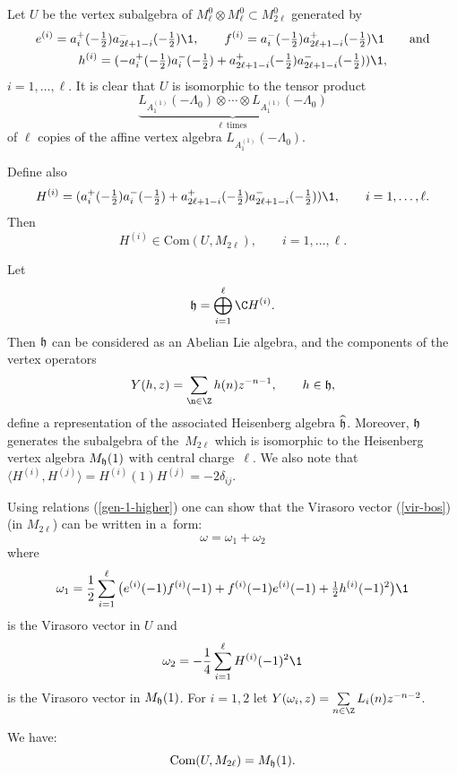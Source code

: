 Let $U$ be the vertex subalgebra  of $M_{\ell} ^0 \otimes M_{\ell}
^0 \subset M_{2 \ell} ^0$ generated by
\begin{gather}
e^{(i)}=a_i ^+ (-\tfrac{1}{2}) a_{
2\ell +1-i} ^-( -\tfrac{1}{2}) {\1}, \qquad  f^{(i)}=a_ i ^-
(-\tfrac{1}{2}) a_{2\ell +1-i} ^+(
-\tfrac{1}{2}) {\1} \qquad \mbox{and} \nonumber \\
 h^{(i)}= (-a_ i ^+ (-\tfrac{1}{2}) a_i^-( -\tfrac{1}{2}) +
a_{2\ell +1-i} ^+ (-\tfrac{1}{2}) a_{2\ell +1-i} ^-( -\tfrac{1}{2})){\1}, \label{gen-1-higher}
 \end{gather}
$i =1, \dots, \ell$. It is clear that $U$ is isomorphic to the tensor product
\[
 \underbrace{ L_{A_1 ^{(1)}}( -\Lambda _{0}) \otimes \cdots \otimes  L_{A_1 ^{(1)}}( -\Lambda _{0})}_{\ell \ \  \mbox{times} }
\]
of $\ell$ copies of the af\/f\/ine vertex algebra $ L_{A_1 ^{(1)}}(-\Lambda _{0})$.

Def\/ine also
 \[
 H ^{(i)} =   (a_i ^+ (-\tfrac{1}{2}) a_i ^- (-\tfrac{1}{2})+a_{2\ell +1-i} ^+ (-\tfrac{1}{2})
 a_{2\ell +1-i} ^- (-\tfrac{1}{2}) ) {\1}, \qquad i=1, \dots,
 \ell.
 \]
 Then
 \[ H ^{(i)} \in \mbox{Com} ( U, M_{2\ell}), \qquad i=1, \dots,  \ell.
 \]

 Let \[ {\frak h}= \bigoplus_{i =1 } ^{ \ell} {\C} H ^{(i)}.\] Then ${\frak h}$ can be
 considered as an Abelian Lie algebra, and the components of the vertex operators
 \[
 Y(h,z) = \sum_{\n \in {\Z} } h(n) z ^{-n-1}, \qquad h \in {\frak  h},
 \]
 def\/ine a representation of the associated Heisenberg algebra $\widehat{\frak h}$.
 Moreover, ${\frak h}$ generates the subalgebra of the~$M_{2 \ell}$ which is isomorphic to the
 Heisenberg vertex algebra $M_{\frak h} (1)$ with central charge~$\ell$.
 We also note that $\langle H ^{(i)}, H ^{(j)} \rangle = H ^{(i)}(1)H ^{(j)}= -2 \delta _{ij}$.


Using relations (\ref{gen-1-higher}) one can show that the Virasoro
vector (\ref{vir-bos}) (in $M_{2 \ell}$) can be written in a~form:
\[ \omega =  \omega_1   + \omega_2 \]
where \[\omega_1 =\frac{1}{2} \sum_{i = 1 } ^{\ell} \big(e
^{(i)}(-1)f^{(i)}(-1)+f ^{(i)} (-1)e^{(i)}(-1)+ \tfrac{1}{2} h ^{(i)}
(-1)^2\big){\1}
\] is the  Virasoro vector  in $U$  and
\[\omega_2 = -\frac{1}{4}\sum_{i = 1 } ^{\ell} H ^{(i) }(-1) ^{2}
{\1}\] is the Virasoro vector   in $M_{\frak h} (1)$.
For $i=1,2$ let
$Y(\omega_i , z) = \sum\limits_{n\in {\Z} } L_i (n) z ^{-n-2}$.

\begin{proposition} \label{com-bos-higher}
We have:
\[
{\rm Com} (U, M_{2\ell}) = M_{\frak h} (1).
\]
\end{proposition}

